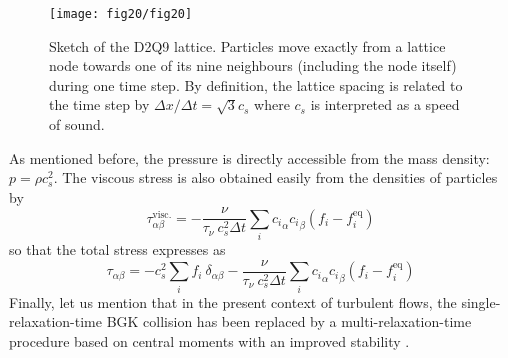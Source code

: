 \begin{figure}
	\centering
	\texttt{[image: fig20/fig20]}
	\caption{Sketch of the D2Q9 lattice. Particles move exactly from a lattice node towards one of its nine neighbours (including the node itself) during one time step. By definition, the lattice spacing is related to the time step by $\Delta x/ \Delta t = \sqrt{3} c_s$ where $c_s$ is interpreted as a speed of sound.}
	\label{fig:D2Q9}
\end{figure}

As mentioned before, the pressure is directly accessible from the mass density: $p = \rho c_s^2$. The viscous stress is also obtained easily from the densities of particles by
\[
\tau^\mathrm{visc.}_{\alpha \beta} = -\frac{\nu}{\tau_\nu ~ c_s^2 \Delta t} \sum_i  {c_i}_\alpha {c_i}_\beta (f_i - f_i^\mathrm{eq})
\]
so that the total stress expresses as
\begin{equation}\label{eq:def_stress}
\tau_{\alpha \beta} = -  c_s^2 \sum_i f_i ~ \delta_{\alpha\beta}  - \frac{\nu}{\tau_\nu ~ c_s^2 \Delta t} \sum_i  {c_i}_\alpha {c_i}_\beta (f_i - f_i^\mathrm{eq})
\end{equation}
Finally, let us mention that in the present context of turbulent flows, the single-relaxation-time BGK collision has been replaced by a multi-relaxation-time procedure based on central moments with an improved stability \citep{De_Rosis_2016}.